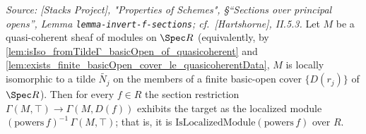 \begin{lemma}
  \textit{Source: [Stacks Project], "Properties of Schemes", \S ``Sections over principal opens'',
  Lemma \texttt{lemma-invert-f-sections}; cf.\ [Hartshorne], II.5.3.}
  Let \(M\) be a quasi-coherent sheaf of modules on \(\Spec R\) (equivalently, by
  \cref{lem:isIso_fromTildeΓ_basicOpen_of_quasicoherent} and
  \cref{lem:exists_finite_basicOpen_cover_le_quasicoherentData}, \(M\) is locally isomorphic to a
  tilde \(\widetilde{N_j}\) on the members of a finite basic-open cover \(\{D(r_j)\}\) of
  \(\Spec R\)). Then for every \(f \in R\) the section restriction
  \(\Gamma(M, \top) \to \Gamma(M, D(f))\) exhibits the target as the localized module
  \((\mathrm{powers}\,f)^{-1}\,\Gamma(M, \top)\); that is, it is
  \(\mathrm{IsLocalizedModule}(\mathrm{powers}\,f)\) over \(R\).
\end{lemma}
